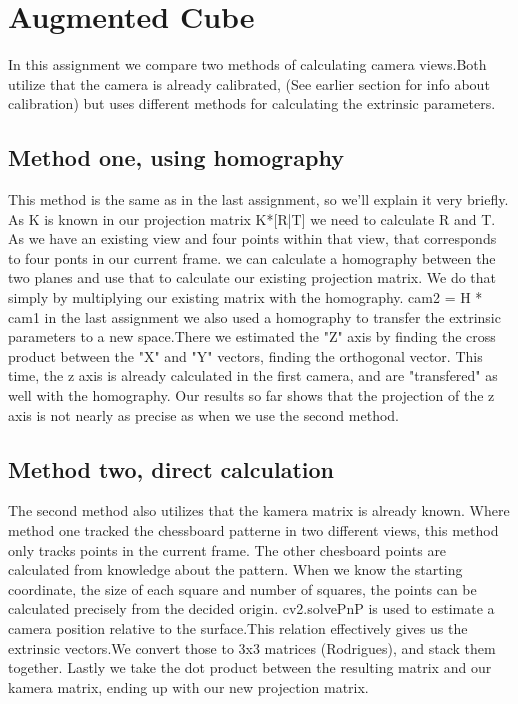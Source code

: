 \section{Augmented Cube} In this assignment we compare two methods of
calculating camera views.Both utilize that the camera is already calibrated,
(See earlier section for info about calibration) but uses different methods for
calculating the extrinsic parameters.  

\subsection{Method one, using homography}
This method is the same as in the last assignment, so we'll explain it very
briefly.  As K is known in our projection matrix K*[R|T] we need to calculate R
and T.  As we have an existing view and four points within that view, that
corresponds to four ponts in our current frame. we can calculate a homography
between the two planes and use that to calculate our existing projection matrix.
We do that simply by multiplying our existing matrix with the homography. cam2 =
H * cam1 in the last assignment we also used a homography to transfer the
extrinsic parameters to a new space.There we estimated the "Z" axis by finding
the cross product between the "X" and "Y" vectors, finding the orthogonal
vector. This time, the z axis is already calculated in the first camera, and are
"transfered" as well with the homography. Our results so far shows that the
projection of the z axis is not nearly as precise as when we use the second
method.

\subsection{Method two, direct calculation} The second method also utilizes that
the kamera matrix is already known. Where method one tracked the chessboard
patterne in two different views, this method only tracks points in the current
frame. The other chesboard points are calculated from knowledge about the
pattern. When we know the starting coordinate, the size of each square and
number of squares, the points can be calculated precisely from the decided
origin. cv2.solvePnP is used to estimate a camera position relative to the
surface.This relation effectively gives us the extrinsic vectors.We convert
those to 3x3 matrices (Rodrigues), and stack them together. Lastly we take the
dot product between the resulting matrix and our kamera matrix, ending up with
our new projection matrix.
